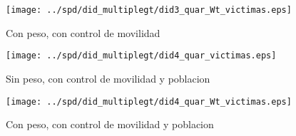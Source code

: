 \documentclass[11pt,letterpaper]{article}
\begin{document}
\begin{figure}[hbtp]
\caption{Con peso, con control de movilidad}
\centering
\texttt{[image: ../spd/did\_multiplegt/did3\_quar\_Wt\_victimas.eps]}
\end{figure}
\begin{figure}[hbtp]
\caption{Sin peso, con control de movilidad y poblacion}
\centering
\texttt{[image: ../spd/did\_multiplegt/did4\_quar\_victimas.eps]}
\end{figure}

\begin{figure}[hbtp]
\caption{Con peso, con control de movilidad y poblacion}
\centering
\texttt{[image: ../spd/did\_multiplegt/did4\_quar\_Wt\_victimas.eps]}
\end{figure}
\end{document}
